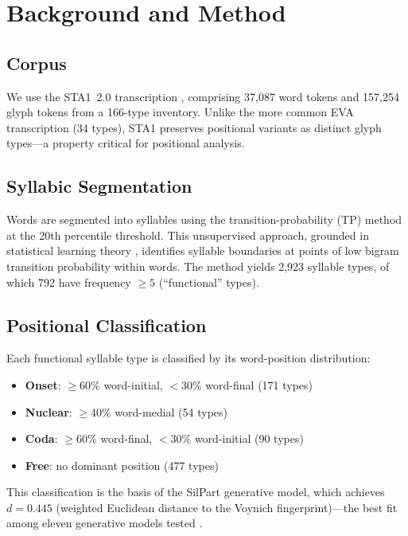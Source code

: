\section{Background and Method}
\label{sec:method}

\subsection{Corpus}

We use the STA1~2.0 transcription \citep{zandbergen2022}, comprising 37,087 word tokens and 157,254 glyph tokens from a 166-type inventory.  Unlike the more common EVA transcription (34 types), STA1 preserves positional variants as distinct glyph types---a property critical for positional analysis.

\subsection{Syllabic Segmentation}

Words are segmented into syllables using the transition-probability (TP) method at the 20th percentile threshold.  This unsupervised approach, grounded in statistical learning theory \citep{saffran1996, harris1955}, identifies syllable boundaries at points of low bigram transition probability within words.  The method yields 2,923 syllable types, of which 792 have frequency $\geq 5$ (``functional'' types).

\subsection{Positional Classification}

Each functional syllable type is classified by its word-position distribution:
\begin{itemize}[nosep]
  \item \textbf{Onset}: $\geq$60\% word-initial, $<$30\% word-final (171 types)
  \item \textbf{Nuclear}: $\geq$40\% word-medial (54 types)
  \item \textbf{Coda}: $\geq$60\% word-final, $<$30\% word-initial (90 types)
  \item \textbf{Free}: no dominant position (477 types)
\end{itemize}

This classification is the basis of the SilPart generative model, which achieves $d = 0.445$ (weighted Euclidean distance to the Voynich fingerprint)---the best fit among eleven generative models tested \citep{jimenez2026}.

